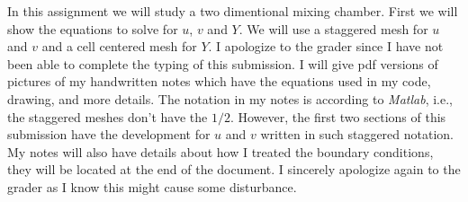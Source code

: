 In this assignment we will study a two dimentional mixing chamber. First we will show the equations to solve for $u$, $v$ and $Y$. We will use a staggered mesh for $u$ and $v$ and a cell centered mesh for $Y$. I apologize to the grader since I have not been able to complete the typing of this submission. I will give pdf versions of pictures of my handwritten notes which have the equations used in my code, drawing, and more details. The notation in my notes is according to \textsl{Matlab}, i.e., the staggered meshes don't have the $1/2$. However, the first  two sections of this submission have the development for $u$ and $v$ written in such staggered notation. My notes will also have details about how I treated the boundary conditions, they will be located at the end of the document. I sincerely apologize again to the grader as I know this might cause some disturbance.
